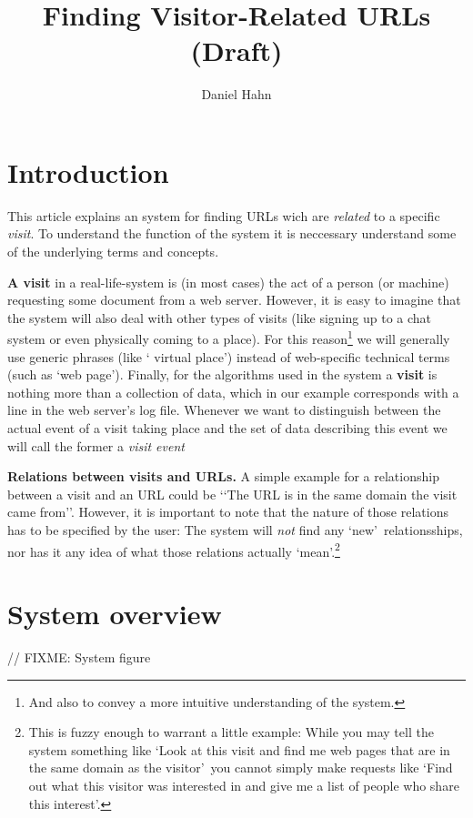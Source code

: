 \documentclass[a4paper]{danarticle}
\begin{document}
  \author{Daniel Hahn}
  \title{Finding Visitor-Related URLs (Draft)}
  \maketitle
  
  \section*{Introduction}
    This article explains an system for finding URLs wich are
    \textit{related} to a specific \textit{visit}. To understand the
    function of the system it is neccessary understand
    some of the underlying terms and concepts.
    
    \textbf{A visit} in a real-life-system is (in most cases) the
    act of a person (or machine) requesting some document from a
    web server. However, it is easy to imagine that the system will
    also deal with other types of visits (like signing up to a
    chat system or even physically coming to a place). For this
    reason\footnote{And also to convey a more intuitive understanding
    of the system.} we will generally use generic phrases (like \lq 
    virtual place\rq ) instead of web-specific technical terms (such
    as \lq web page\rq ). Finally, for the algorithms used in the
    system a \textbf{visit} is nothing more than a collection of
    data, which in our example corresponds with a line in the web
    server's log file. Whenever we want to distinguish between the
    actual event of a visit taking place and the set of data
    describing this event we will call the former a \textit{visit event}
   
    \textbf{Relations between visits and URLs.} A simple example
    for a relationship between a visit and an URL could be
    \lq\lq The URL is in the same domain the visit came from\rq\rq .
    However, it is important to note that the nature of those 
    relations has to be specified by the user: The system will 
    \textit{not} find any \lq new\rq\ relationsships, nor has it 
    any idea of what those relations actually \lq mean\rq .\footnote{This
    is fuzzy enough to warrant a little example: While you may tell the
    system something like \lq Look at this visit and find me web 
    pages that are in the same domain as the visitor\rq\ you cannot
    simply make requests like \lq Find out what this visitor was 
    interested in and give me a list of people who share this
    interest\rq .} 
  \section*{System overview}
    // FIXME: System figure
\end{document}
